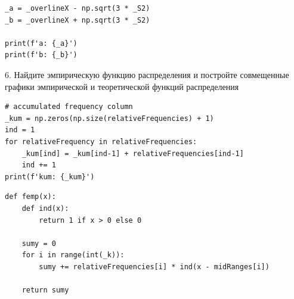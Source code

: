 \documentclass[a4paper, 14pt]{extarticle}
\begin{document}
\begin{lstlisting}
_a = _overlineX - np.sqrt(3 * _S2)
_b = _overlineX + np.sqrt(3 * _S2)

print(f'a: {_a}')
print(f'b: {_b}')
\end{lstlisting}

\begin{center}
    6. Найдите эмпирическую функцию распределения и постройте совмещенные 
    графики эмпирической и теоретической функций распределения
\end{center}

\begin{lstlisting}
# accumulated frequency column
_kum = np.zeros(np.size(relativeFrequencies) + 1)
ind = 1 
for relativeFrequency in relativeFrequencies:
    _kum[ind] = _kum[ind-1] + relativeFrequencies[ind-1]
    ind += 1
print(f'kum: {_kum}')
\end{lstlisting}

\begin{lstlisting}[caption={эмпирическая функция распределения femp(x)}, label={lst:14}]
def femp(x):
    def ind(x):
        return 1 if x > 0 else 0

    sumy = 0 
    for i in range(int(_k)):
        sumy += relativeFrequencies[i] * ind(x - midRanges[i])
    
    return sumy
\end{lstlisting}
\end{document}
